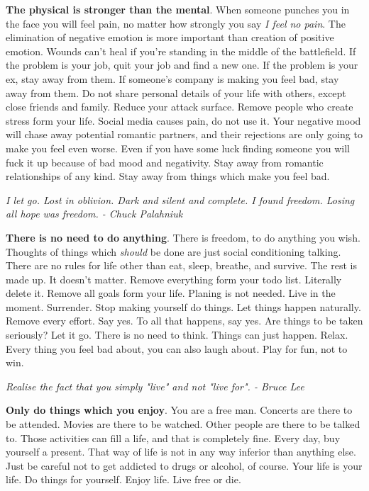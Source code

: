 \documentclass[a4paper,hidelinks]{article}
\begin{document}
\textbf{The physical is stronger than the mental}.
When someone punches you in the face you will feel pain, no matter how strongly you say \textit{I feel no pain}.
The elimination of negative emotion is more important than creation of positive emotion.
Wounds can't heal if you're standing in the middle of the battlefield.
If the problem is your job, quit your job and find a new one.
If the problem is your ex, stay away from them.
If someone's company is making you feel bad, stay away from them.
Do not share personal details of your life with others, except close friends and family.
Reduce your attack surface.
Remove people who create stress form your life.
Social media causes pain, do not use it.
Your negative mood will chase away potential romantic partners, and their rejections are only going to make you feel even worse.
Even if you have some luck finding someone you will fuck it up because of bad mood and negativity.
Stay away from romantic relationships of any kind.
Stay away from things which make you feel bad.

\newpage

\begin{center}
\textit{
I let go.  Lost in oblivion.  Dark and silent and complete.  I found freedom.  Losing all hope was freedom. - Chuck Palahniuk
}
\end{center}

\textbf{There is no need to do anything}.
There is freedom, to do anything you wish.
Thoughts of things which \textit{should} be done are just social conditioning talking.
There are no rules for life other than eat, sleep, breathe, and survive.
The rest is made up.
It doesn't matter.
Remove everything form your todo list.
Literally delete it.
Remove all goals form your life.
Planing is not needed.
Live in the moment.
Surrender.
Stop making yourself do things.
Let things happen naturally.
Remove every effort.
Say yes.
To all that happens, say yes.
Are things to be taken seriously?
Let it go.
There is no need to think.
Things can just happen.
Relax.
Every thing you feel bad about, you can also laugh about.
Play for fun, not to win.

\newpage

\begin{center}
\textit{
Realise the fact that you simply "live" and not "live for". - Bruce Lee
}
\end{center}

\textbf{Only do things which you enjoy}.
You are a free man.
Concerts are there to be attended.
Movies are there to be watched.
Other people are there to be talked to.
Those activities can fill a life, and that is completely fine.
Every day, buy yourself a present.
That way of life is not in any way inferior than anything else.
Just be careful not to get addicted to drugs or alcohol, of course.
Your life is your life.
Do things for yourself.
Enjoy life.
Live free or die.
\end{document}
